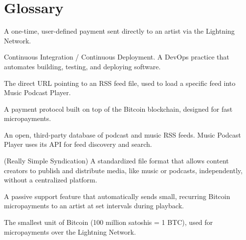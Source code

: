 \documentclass{article}
\begin{document}
\section{Glossary}
\begin{description}[itemsep=6pt]
    \item[Boost / Boostagram] A one-time, user-defined payment sent directly 
    to an artist via the Lightning Network.
    \item[CI/CD] Continuous Integration / Continuous Deployment. A DevOps 
    practice that automates building, testing, and deploying software.
    \item[Feed URL] The direct URL pointing to an RSS feed file, used to 
    load a specific feed into Music Podcast Player.
    \item[Lightning Network] A payment protocol built on top of the Bitcoin 
    blockchain, designed for fast micropayments.
    \item[Podcast Index] An open, third-party database of podcast and music 
    RSS feeds. Music Podcast Player uses its API for feed discovery and search.
    \item[RSS Feed] (Really Simple Syndication) A standardized file format 
    that allows content creators to publish and distribute media, like 
    music or podcasts, independently, without a centralized platform.
    \item[Sat Dripping] A passive support feature that automatically sends 
    small, recurring Bitcoin micropayments to an artist at set intervals 
    during playback.
    \item[Satoshi (Sat)] The smallest unit of Bitcoin (100 million satoshis 
    = 1 BTC), used for micropayments over the Lightning Network.
\end{description}
\end{document}
